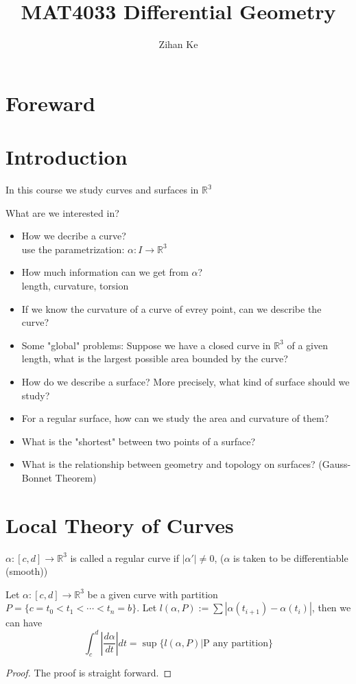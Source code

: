 \documentclass{article}
\title{MAT4033 Differential Geometry}
\author{Zihan Ke}
\begin{document}
\maketitle
\newpage
\tableofcontents
\newpage
\section*{Foreward}

\newpage
\section*{Introduction}
\noindent In this course we study curves and surfaces in $\mathbb{R^3}$

What are we interested in?
\begin{itemize}
    \item How we decribe a curve?
    \\ use the parametrization: $\alpha:I \to \mathbb{R}^3 $
    \item How much information can we get from $\alpha$?
    \\ length, curvature, torsion
    \item If we know the curvature of a curve of evrey point, can we describe the curve?
    \item Some "global" problems: Suppose we have a closed curve in $\mathbb{R}^3$ of a given length, what is the largest possible area bounded by the curve?
    \item How do we describe a surface? More precisely, what kind of surface should we study?
    \item For a regular surface, how can we study the area and curvature of them?
    \item What is the "shortest" between two points of a surface?
    \item What is the relationship between geometry and topology on surfaces? (Gauss-Bonnet Theorem)
\end{itemize}
\newpage
\section{Local Theory of Curves}
\begin{definition}
    $\alpha: [c,d]\to \mathbb{R}^3$ is called a regular curve if $|\alpha'|\neq0$, ($\alpha$ is taken to be differentiable (smooth))
\end{definition}

\begin{proposition}
    Let $\alpha:[c,d]\to \mathbb{R}^3$ be a given curve with partition $P=\{c=t_0<t_1<\cdots <t_n=b\}$. Let $l(\alpha,P):=\sum |\alpha(t_{i+1})-\alpha(t_{i})|$, then we can have \[\int_c^d |\frac{d\alpha}{dt}|dt=\operatorname{sup}\{l(\alpha,P)| \text{P any partition}\}\]
\end{proposition}
\begin{proof}
The proof is straight forward.
\end{proof}
\end{document}
